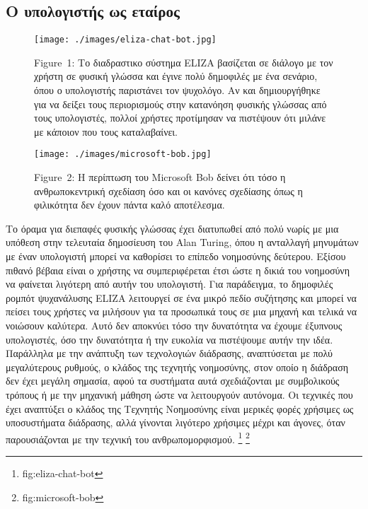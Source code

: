 \documentclass[
]{article}
\begin{document}
\hypertarget{ux3bf-ux3c5ux3c0ux3bfux3bbux3bfux3b3ux3b9ux3c3ux3c4ux3aeux3c2-ux3c9ux3c2-ux3b5ux3c4ux3b1ux3afux3c1ux3bfux3c2}{%
\subsection{Ο υπολογιστής ως
εταίρος}\label{ux3bf-ux3c5ux3c0ux3bfux3bbux3bfux3b3ux3b9ux3c3ux3c4ux3aeux3c2-ux3c9ux3c2-ux3b5ux3c4ux3b1ux3afux3c1ux3bfux3c2}}

\leavevmode{}%
\begin{figure}
\hypertarget{fig:eliza-chat-bot}{%
\centering
\texttt{[image: ./images/eliza-chat-bot.jpg]}
\caption{Figure~1: Το διαδραστικο σύστημα ELIZA βασίζεται σε διάλογο με
τον χρήστη σε φυσική γλώσσα και έγινε πολύ δημοφιλές με ένα σενάριο,
όπου ο υπολογιστής παριστάνει τον ψυχολόγο. Αν και δημιουργήθηκε για να
δείξει τους περιορισμούς στην κατανόηση φυσικής γλώσσας από τους
υπολογιστές, πολλοί χρήστες προτίμησαν να πιστέψουν ότι μιλάνε με
κάποιον που τους καταλαβαίνει.}\label{fig:eliza-chat-bot}
}
\end{figure}

\leavevmode{}%
\begin{figure}
\hypertarget{fig:microsoft-bob}{%
\centering
\texttt{[image: ./images/microsoft-bob.jpg]}
\caption{Figure~2: Η περίπτωση του Microsoft Bob δείνει ότι τόσο η
ανθρωποκεντρική σχεδίαση όσο και οι κανόνες σχεδίασης όπως η φιλικότητα
δεν έχουν πάντα καλό αποτέλεσμα.}\label{fig:microsoft-bob}
}
\end{figure}

Το όραμα για διεπαφές φυσικής γλώσσας έχει διατυπωθεί από πολύ νωρίς με
μια υπόθεση στην τελευταία δημοσίευση του Alan Turing, όπου η ανταλλαγή
μηνυμάτων με έναν υπολογιστή μπορεί να καθορίσει το επίπεδο νοημοσύνης
δεύτερου. Εξίσου πιθανό βέβαια είναι ο χρήστης να συμπεριφέρεται έτσι
ώστε η δικιά του νοημοσύνη να φαίνεται λιγότερη από αυτήν του
υπολογιστή. Για παράδειγμα, το δημοφιλές ρομπότ ψυχανάλυσης ELIZA
λειτουργεί σε ένα μικρό πεδίο συζήτησης και μπορεί να πείσει τους
χρήστες να μιλήσουν για τα προσωπικά τους σε μια μηχανή και τελικά να
νοιώσουν καλύτερα. Αυτό δεν αποκνύει τόσο την δυνατότητα να έχουμε
έξυπνους υπολογιστές, όσο την δυνατότητα ή την ευκολία να πιστέψουμε
αυτήν την ιδέα. Παράλληλα με την ανάπτυξη των τεχνολογιών διάδρασης,
αναπτύσεται με πολύ μεγαλύτερους ρυθμούς, ο κλάδος της τεχνητής
νοημοσύνης, στον οποίο η διάδραση δεν έχει μεγάλη σημασία, αφού τα
συστήματα αυτά σχεδιάζονται με συμβολικούς τρόπους ή με την μηχανική
μάθηση ώστε να λειτουργούν αυτόνομα. Οι τεχνικές που έχει αναπτύξει ο
κλάδος της Τεχνητής Νοημοσύνης είναι μερικές φορές χρήσιμες ως
υποσυστήματα διάδρασης, αλλά γίνονται λιγότερο χρήσιμες μέχρι και
άγονες, όταν παρουσιάζονται με την τεχνική του ανθρωπομορφισμού.
\footnote{fig:eliza-chat-bot} \footnote{fig:microsoft-bob}
\end{document}
